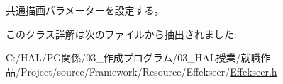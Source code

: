 共通描画パラメーターを設定する。 



このクラス詳解は次のファイルから抽出されました\+:\begin{DoxyCompactItemize}
\item 
C\+:/\+H\+A\+L/\+P\+G関係/03\+\_\+作成プログラム/03\+\_\+\+H\+A\+L授業/就職作品/\+Project/source/\+Framework/\+Resource/\+Effekseer/\mbox{\hyperlink{_effekseer_8h}{Effekseer.\+h}}\end{DoxyCompactItemize}
